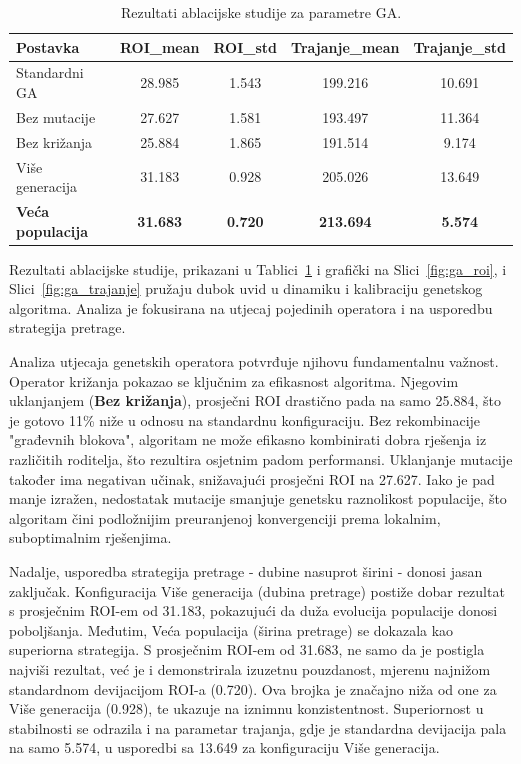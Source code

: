 \begin{table}[H]
    \centering
    \caption{Rezultati ablacijske studije za parametre GA.}
    \label{tab:ga_ablation}
    \begin{tabular}{|l|c|c|c|c|}
        \hline
        \textbf{Postavka} & \textbf{ROI\_mean} & \textbf{ROI\_std} & \textbf{Trajanje\_mean} & \textbf{Trajanje\_std} \\
        \hline
        Standardni GA & 28.985 & 1.543 & 199.216 & 10.691 \\
        Bez mutacije & 27.627 & 1.581 & 193.497 & 11.364 \\
        Bez križanja & 25.884 & 1.865 & 191.514 & 9.174 \\
        Više generacija & 31.183 & 0.928 & 205.026 & 13.649 \\
        \textbf{Veća populacija} & \textbf{31.683} & \textbf{0.720} & \textbf{213.694} & \textbf{5.574} \\
        \hline
    \end{tabular}
\end{table}

Rezultati ablacijske studije, prikazani u Tablici~\ref{tab:ga_ablation} i grafički na Slici~\ref{fig:ga_roi}, i Slici~\ref{fig:ga_trajanje} pružaju dubok uvid u dinamiku i kalibraciju genetskog algoritma. Analiza je fokusirana na utjecaj pojedinih operatora i na usporedbu strategija pretrage.

Analiza utjecaja genetskih operatora potvrđuje njihovu fundamentalnu važnost. Operator križanja pokazao se ključnim za efikasnost algoritma. Njegovim uklanjanjem (\textbf{Bez križanja}), prosječni ROI drastično pada na samo 25.884, što je gotovo 11\% niže u odnosu na standardnu konfiguraciju. Bez rekombinacije "građevnih blokova", algoritam ne može efikasno kombinirati dobra rješenja iz različitih roditelja, što rezultira osjetnim padom performansi. Uklanjanje mutacije također ima negativan učinak, snižavajući prosječni ROI na 27.627. Iako je pad manje izražen, nedostatak mutacije smanjuje genetsku raznolikost populacije, što algoritam čini podložnijim preuranjenoj konvergenciji prema lokalnim, suboptimalnim rješenjima.

Nadalje, usporedba strategija pretrage - dubine nasuprot širini - donosi jasan zaključak. Konfiguracija Više generacija (dubina pretrage) postiže dobar rezultat s prosječnim ROI-em od 31.183, pokazujući da duža evolucija populacije donosi poboljšanja. Međutim, Veća populacija (širina pretrage) se dokazala kao superiorna strategija. S prosječnim ROI-em od 31.683, ne samo da je postigla najviši rezultat, već je i demonstrirala izuzetnu pouzdanost, mjerenu najnižom standardnom devijacijom ROI-a (0.720). Ova brojka je značajno niža od one za Više generacija (0.928), te ukazuje na iznimnu konzistentnost. Superiornost u stabilnosti se odrazila i na parametar trajanja, gdje je standardna devijacija pala na samo 5.574, u usporedbi sa 13.649 za konfiguraciju Više generacija.

